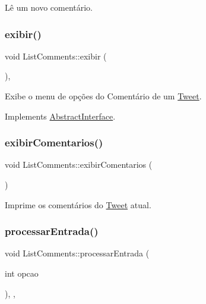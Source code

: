 Lê um novo comentário. 

\mbox{\label{class_list_comments_ae1944d4065ee2d2954ee8cdefc17a2bf}} 
\subsubsection{\texorpdfstring{exibir()}{exibir()}}
{\footnotesize\ttfamily void List\+Comments\+::exibir (\begin{DoxyParamCaption}{ }\end{DoxyParamCaption})\hspace{0.3cm}{\ttfamily [override]}, {\ttfamily [virtual]}}



Exibe o menu de opções do Comentário de um \hyperlink{class_tweet}{Tweet}. 



Implements \hyperlink{class_abstract_interface_a1d5d2a15e6e640bd0190a835cb64e5ed}{Abstract\+Interface}.

\mbox{\label{class_list_comments_a90342b6dce4d59f785788163524284a4}} 
\subsubsection{\texorpdfstring{exibir\+Comentarios()}{exibirComentarios()}}
{\footnotesize\ttfamily void List\+Comments\+::exibir\+Comentarios (\begin{DoxyParamCaption}{ }\end{DoxyParamCaption})\hspace{0.3cm}{\ttfamily [private]}}



Imprime os comentários do \hyperlink{class_tweet}{Tweet} atual. 

\mbox{\label{class_list_comments_a5f1742eb60e1fb9977bab791c3b8a672}} 
\subsubsection{\texorpdfstring{processar\+Entrada()}{processarEntrada()}}
{\footnotesize\ttfamily void List\+Comments\+::processar\+Entrada (\begin{DoxyParamCaption}\item[{int}]{opcao }\end{DoxyParamCaption})\hspace{0.3cm}{\ttfamily [override]}, {\ttfamily [private]}, {\ttfamily [virtual]}}



